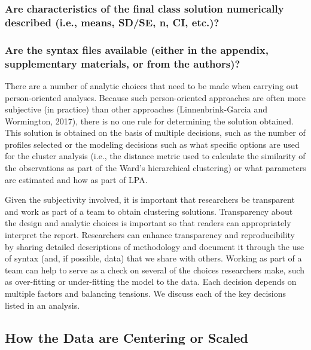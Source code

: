 \documentclass[
  english,
  man]{apa6}
\begin{document}
\hypertarget{are-characteristics-of-the-final-class-solution-numerically-described-i.e.-means-sdse-n-ci-etc.}{%
\subsubsection{Are characteristics of the final class solution numerically described (i.e., means, SD/SE, n, CI, etc.)?}\label{are-characteristics-of-the-final-class-solution-numerically-described-i.e.-means-sdse-n-ci-etc.}}

\hypertarget{are-the-syntax-files-available-either-in-the-appendix-supplementary-materials-or-from-the-authors}{%
\subsubsection{Are the syntax files available (either in the appendix, supplementary materials, or from the authors)?}\label{are-the-syntax-files-available-either-in-the-appendix-supplementary-materials-or-from-the-authors}}

There are a number of analytic choices that need to be made when carrying out
person-oriented analyses. Because such person-oriented approaches are often more
subjective (in practice) than other approaches (Linnenbrink-Garcia and
Wormington, 2017), there is no one rule for determining the solution obtained.
This solution is obtained on the basis of multiple decisions, such as the number
of profiles selected or the modeling decisions such as what specific options are
used for the cluster analysis (i.e., the distance metric used to calculate the
similarity of the observations as part of the Ward's hierarchical clustering) or
what parameters are estimated and how as part of LPA.

Given the subjectivity involved, it is important that researchers be transparent
and work as part of a team to obtain clustering solutions. Transparency about
the design and analytic choices is important so that readers can appropriately
interpret the report. Researchers can enhance transparency and reproducibility
by sharing detailed descriptions of methodology and document it through the use
of syntax (and, if possible, data) that we share with others. Working as part of
a team can help to serve as a check on several of the choices researchers make,
such as over-fitting or under-fitting the model to the data. Each decision
depends on multiple factors and balancing tensions. We discuss each of the key
decisions listed in an analysis.

\hypertarget{how-the-data-are-centering-or-scaled}{%
\subsection{How the Data are Centering or Scaled}\label{how-the-data-are-centering-or-scaled}}
\end{document}
